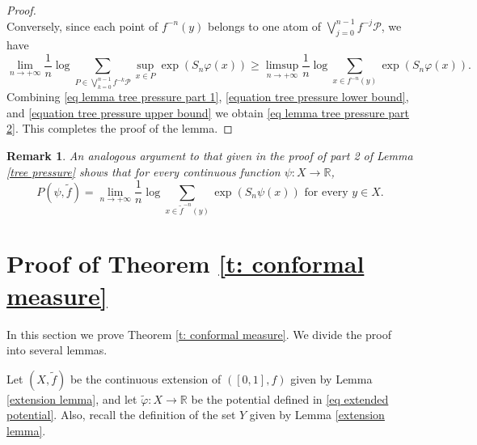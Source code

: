 \documentclass[10pt,a4paper]{amsart}
\numberwithin{equation}{section} %
\numberwithin{figure}{section} %
\newtheorem{rema}[prop]{Remark}
\newcommand{\R}{\mathbb{R}}
\renewcommand{\=}{\coloneqq}
\begin{document}
\begin{proof}
\begin{equation}
\end{equation}
Conversely, since each point of $f^{-n}(y)$ belongs to one atom of $\bigvee_{j=0}^{n-1} f^{-j}\mathcal{P}$, we have
\begin{equation}\label{equation tree pressure upper bound}
    \lim_{n\to+\infty}  \frac{1}{n}\log \sum_{P\in \bigvee_{k=0}^{n-1}f^{-k} \mathcal{P}} \sup_{x\in P}\exp(S_n\varphi(x)) \geq \limsup_{n\to+\infty} \frac{1}{n} \log \sum_{x\in f^{-n}(y)} \exp(S_n \varphi(x)).
\end{equation}
Combining \eqref{eq lemma tree pressure part 1}, \eqref{equation tree pressure lower bound}, and \eqref{equation tree pressure upper bound} we obtain \eqref{eq lemma tree pressure part 2}. This completes the proof of the lemma. 
\end{proof}
\begin{rema}\label{r: pressure via transfer op for the extension}
    An analogous argument to that given in the proof of part 2 of Lemma \ref{tree pressure} shows that for every continuous function $\psi: X \to \R$,
    \begin{equation*}
        P(\psi,\widetilde{f}) = \lim_{n\to+\infty}\frac{1}{n}\log \sum_{x\in \widetilde{f}^{-n}(y)} \exp(S_n\psi(x)) \text{ for every } y\in X.
    \end{equation*}
\end{rema}

\section{Proof of Theorem \ref{t: conformal measure}}\label{sec: proof of theo A} 

In this section we prove Theorem \ref{t: conformal measure}. We divide the proof into several lemmas.

\noindent Let $( X, \widetilde{f})$ be the continuous extension of $([0,1],f)$ given by Lemma \ref{extension lemma}, and let $\widetilde{\varphi}: X\to \R$ be the potential defined in \eqref{eq extended potential}. Also, recall the definition of the set ${Y}$ given by Lemma \ref{extension lemma}.
\end{document}
